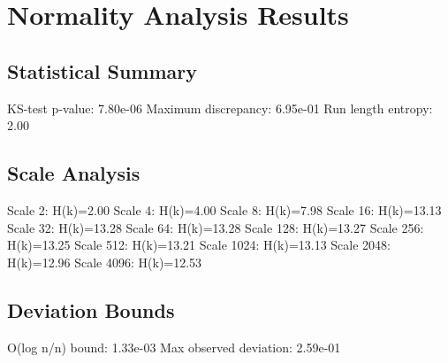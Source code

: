 \section{Normality Analysis Results}

\subsection{Statistical Summary}
KS-test p-value: 7.80e-06
Maximum discrepancy: 6.95e-01
Run length entropy: 2.00

\subsection{Scale Analysis}
Scale 2: H(k)=2.00
Scale 4: H(k)=4.00
Scale 8: H(k)=7.98
Scale 16: H(k)=13.13
Scale 32: H(k)=13.28
Scale 64: H(k)=13.28
Scale 128: H(k)=13.27
Scale 256: H(k)=13.25
Scale 512: H(k)=13.21
Scale 1024: H(k)=13.13
Scale 2048: H(k)=12.96
Scale 4096: H(k)=12.53
\subsection{Deviation Bounds}
O(log n/n) bound: 1.33e-03
Max observed deviation: 2.59e-01
